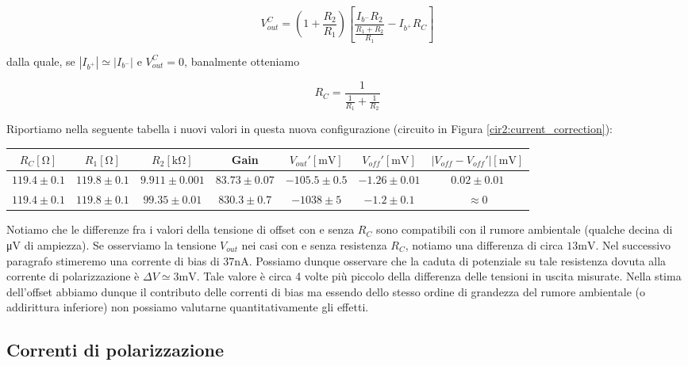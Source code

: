 \begin{equation}
V_{out}^{C} = \left( 1+\frac{R_2}{R_1} \right)\left[ \frac{I_{b^-}R_2}{\frac{R_1+R_2}{R_1}} - I_{b^+} R_C\right]
\label{eq2:Vout_currents}
\end{equation}

dalla quale, se $|I_{b^+}|\simeq|I_{b^-}|$ e $V_{out}^{C}=0$, banalmente otteniamo

$$R_C=\frac{1}{\frac{1}{R_1} + \frac{1}{R_2}} $$



Riportiamo nella seguente tabella i nuovi valori in questa nuova configurazione (circuito in Figura \ref{cir2:current_correction}):

\begin{center}
\begin{tabular}{c|c|c|c|c|c|c}
$R_C [\si{\ohm}]$& $R_1[\si{\ohm}]$ & $R_2[\si{\kilo\ohm}]$ & Gain & $V_{out}' [\si{\milli\volt}]$ & $V_{off}' [\si{\milli\volt}]$ & $|V_{off}-V_{off}'|[\si{\milli\volt}]$ \\ 
\hline 
$119.4\pm0.1$ & $119.8\pm0.1$ & $9.911\pm0.001$  & $83.73 \pm 0.07$ & $-105.5 \pm 0.5$ & $-1.26 \pm0.01$ & $0.02\pm0.01$ \\
\hline
$119.4\pm0.1$ & $119.8\pm0.1$ & $99.35\pm0.01$  & $830.3\pm0.7$ &$ -1038 \pm 5$ & $-1.2 \pm 0.1$ & $\approx 0$\\
\end{tabular}
\end{center}

Notiamo che le differenze fra i valori della tensione di offset con e senza $R_C$ sono compatibili con il rumore ambientale (qualche decina di \si{\micro\volt} di ampiezza). Se osserviamo la tensione $V_{out}$ nei casi con e senza resistenza $R_C$, notiamo una differenza di circa $13\si{\milli\volt}$. Nel successivo paragrafo stimeremo una corrente di bias di $37\si{\nano\ampere}$. Possiamo dunque osservare che la caduta di potenziale su tale resistenza dovuta alla corrente di polarizzazione è $\Delta V \simeq 3 \si{\milli\volt}$. Tale valore è circa 4 volte più piccolo della differenza delle tensioni in uscita misurate. Nella stima dell'offset abbiamo dunque il contributo delle correnti di bias ma essendo dello stesso ordine di grandezza del rumore ambientale (o addirittura inferiore) non possiamo valutarne quantitativamente gli effetti. 

\subsection{Correnti di polarizzazione}

